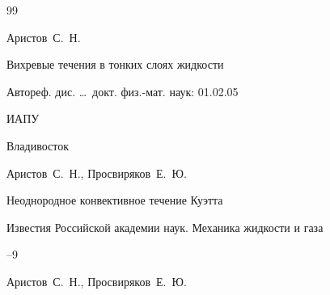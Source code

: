 \begin{thebibliography}{99}









\by Аристов~С.~Н.

\thesis Вихревые течения в тонких слоях жидкости 

\thesisinfo Автореф. дис. \dots\ докт. физ.-мат. наук: 01.02.05


\publ ИАПУ

\publaddr Владивосток







\by  Аристов~С.~Н.,  Просвиряков~Е.~Ю.

\paper Неоднородное конвективное течение Куэтта

\jour Известия Российской академии наук. Механика жидкости и газа



--9
















\by  Аристов~С.~Н.,  Просвиряков~Е.~Ю.


\end{thebibliography}

